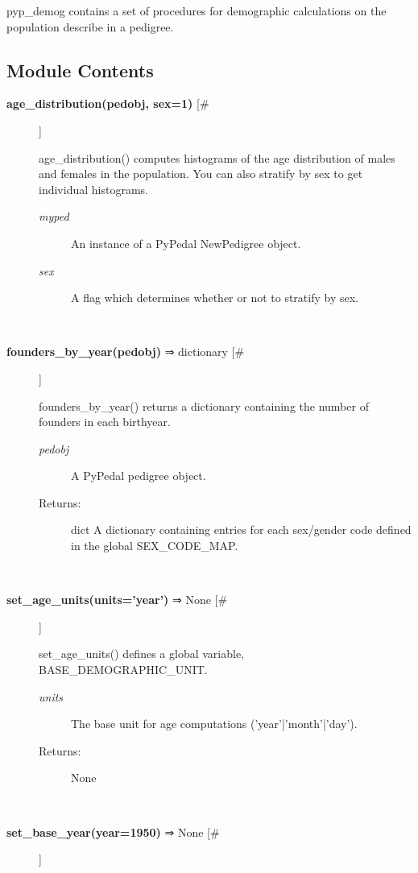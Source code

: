 

 pyp\_demog contains a set of procedures for demographic calculations on the population describe in a pedigree.
\subsection*{Module Contents}
\begin{description}
\item[\textbf{age\_distribution(pedobj, sex=1)}
 [\#]]

 age\_distribution() computes histograms of the age distribution of males and females in the population. You can also stratify by sex to get individual histograms.
\begin{description}
\item[\emph{myped}
] An instance of a PyPedal NewPedigree object.
\item[\emph{sex}
] A flag which determines whether or not to stratify by sex.

\end{description}
\\ 

\item[\textbf{founders\_by\_year(pedobj)}
 ⇒ dictionary [\#]]

 founders\_by\_year() returns a dictionary containing the number of founders in each birthyear.
\begin{description}
\item[\emph{pedobj}
] A PyPedal pedigree object.
\item[Returns:] dict A dictionary containing entries for each sex/gender code defined in the global SEX\_CODE\_MAP.

\end{description}
\\ 

\item[\textbf{set\_age\_units(units='year')}
 ⇒ None [\#]]

 set\_age\_units() defines a global variable, BASE\_DEMOGRAPHIC\_UNIT.
\begin{description}
\item[\emph{units}
] The base unit for age computations ('year'|'month'|'day').
\item[Returns:] None

\end{description}
\\ 

\item[\textbf{set\_base\_year(year=1950)}
 ⇒ None [\#]]


\end{description}
